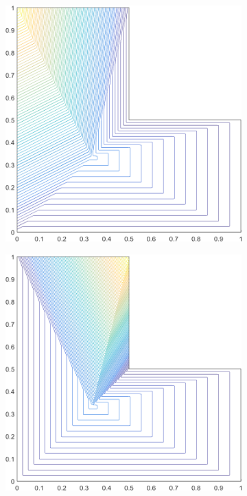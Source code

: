 \begin{figure}
\centering
	\begin{subfigure}[b]{0.39\textwidth}
		\centering
		\includegraphics[width=\textwidth]{figures/sec_BF/L-domain_PWLD1_contour_b6.png}
		\caption{}
	\end{subfigure}
	\hspace{1.5cm}
	\begin{subfigure}[b]{0.39\textwidth}
		\centering
		\includegraphics[width=\textwidth]{figures/sec_BF/L-domain_PWLD1_contour_b5.png}

\end{subfigure}
\end{figure}
